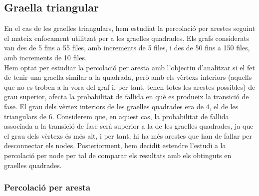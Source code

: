 \documentclass[a4paper]{article}
\begin{document}
	\subsection{Graella triangular}
	
	En el cas de les graelles triangulars, hem estudiat la percolació per arestes seguint el mateix enfocament utilitzat per a les graelles quadrades. Els grafs considerats van des de 5 fins a 55 files, amb increments de 5 files, i des de 50 fins a 150 files, amb increments de 10 files. \\
	
	Hem optat per estudiar la percolació per aresta amb l'objectiu d'analitzar si el fet de tenir una graella similar a la quadrada, però amb els vèrtexs interiors (aquells que no es troben a la vora del graf i, per tant, tenen totes les arestes possibles) de grau superior, afecta la probabilitat de fallida en què es produeix la transició de fase. El grau dels vèrtex interiors de les graelles quadrades era de $4$, el de les triangulars de $6$. Considerem que, en aquest cas, la probabilitat de fallida associada a la transició de fase serà superior a la de les graelles quadrades, ja que el grau dels vèrtexs és més alt, i per tant, hi ha més arestes que han de fallar per desconnectar els nodes. Posteriorment, hem decidit estendre l'estudi a la percolació per node per tal de comparar els resultats amb els obtinguts en graelles quadrades.
	
	\subsubsection{Percolació per aresta}
	
\end{document}
